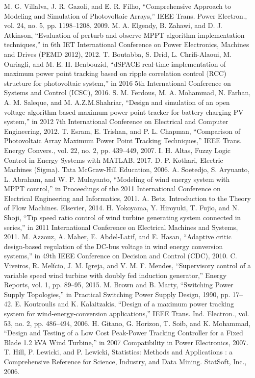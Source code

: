 \begin{thebibliography}{}

M. G. Villalva, J. R. Gazoli, and E. R. Filho, “Comprehensive Approach to Modeling and Simulation of Photovoltaic Arrays,” IEEE Trans. Power Electron., vol. 24, no. 5, pp. 1198–1208, 2009.
M. A. Elgendy, B. Zahawi, and D. J. Atkinson, “Evaluation of perturb and observe MPPT algorithm implementation techniques,” in 6th IET International Conference on Power Electronics, Machines and Drives (PEMD 2012), 2012.
T. Boutabba, S. Drid, L. Chrifi-Alaoui, M. Ouriagli, and M. E. H. Benbouzid, “dSPACE real-time implementation of maximum power point tracking based on ripple correlation control (RCC) structure for photovoltaic system,” in 2016 5th International Conference on Systems and Control (ICSC), 2016.
S. M. Ferdous, M. A. Mohammad, N. Farhan, A. M. Saleque, and M. A.Z.M.Shahriar, “Design and simulation of an open voltage algorithm based maximum power point tracker for battery charging PV system,” in 2012 7th International Conference on Electrical and Computer Engineering, 2012.
T. Esram, E. Trishan, and P. L. Chapman, “Comparison of Photovoltaic Array Maximum Power Point Tracking Techniques,” IEEE Trans. Energy Convers., vol. 22, no. 2, pp. 439–449, 2007.
I. H. Altas, Fuzzy Logic Control in Energy Systems with MATLAB. 2017.
D. P. Kothari, Electric Machines (Sigma). Tata McGraw-Hill Education, 2006.
A. Soetedjo, S. Aryuanto, L. Abraham, and W. P. Mulayanto, “Modeling of wind energy system with MPPT control,” in Proceedings of the 2011 International Conference on Electrical Engineering and Informatics, 2011.
A. Betz, Introduction to the Theory of Flow Machines. Elsevier, 2014.
H. Yokoyama, Y. Hiroyuki, T. Fujio, and N. Shoji, “Tip speed ratio control of wind turbine generating system connected in series,” in 2011 International Conference on Electrical Machines and Systems, 2011.
M. Azzouz, A. Maher, E. Abdel-Latif, and E. Hasan, “Adaptive critic design-based regulation of the DC-bus voltage in wind energy conversion systems,” in 49th IEEE Conference on Decision and Control (CDC), 2010.
C. Viveiros, R. Melício, J. M. Igreja, and V. M. F. Mendes, “Supervisory control of a variable speed wind turbine with doubly fed induction generator,” Energy Reports, vol. 1, pp. 89–95, 2015.
M. Brown and B. Marty, “Switching Power Supply Topologies,” in Practical Switching Power Supply Design, 1990, pp. 17–42.
E. Koutroulis and K. Kalaitzakis, “Design of a maximum power tracking system for wind-energy-conversion applications,” IEEE Trans. Ind. Electron., vol. 53, no. 2, pp. 486–494, 2006.
H. Gitano, G. Horizon, T. Soib, and K. Mohammad, “Design and Testing of a Low Cost Peak-Power Tracking Controller for a Fixed Blade 1.2 kVA Wind Turbine,” in 2007 Compatibility in Power Electronics, 2007.
T. Hill, P. Lewicki, and P. Lewicki, Statistics: Methods and Applications : a Comprehensive Reference for Science, Industry, and Data Mining. StatSoft, Inc., 2006.





\end{thebibliography}




